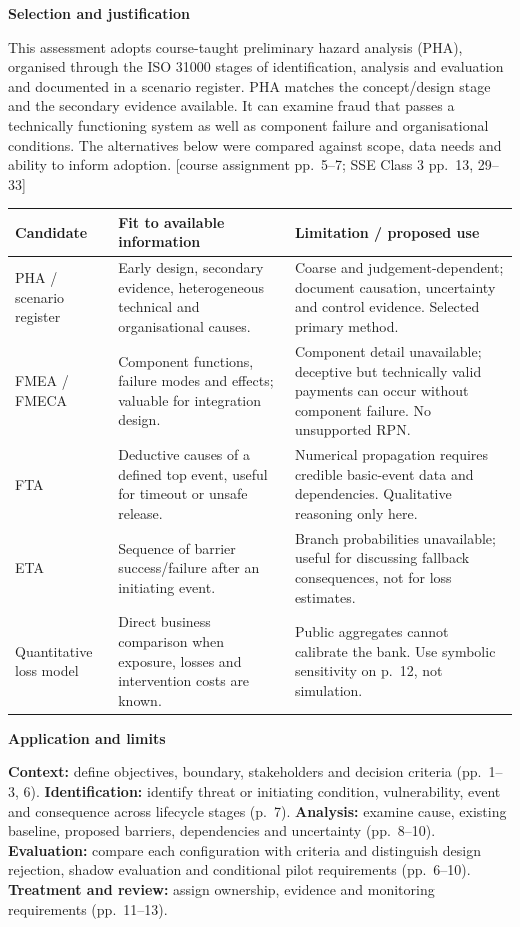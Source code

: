 \documentclass[11pt,a4paper]{article}
\newcommand{\heading}[2]{\vspace*{1mm}{\small\color{ink}\textbf{#1}}\par\vspace{2mm}{\LARGE\color{ink}\textbf{#2}}\par\vspace{3mm}}
\newcommand{\sub}[1]{\par\vspace{2mm}\textbf{\color{ink}#1}\par}
\newcommand{\src}[1]{{\small[#1]}}
\newcommand{\newpageof}[2]{\clearpage\normalsize\fontsize{10.5}{12.5}\selectfont\heading{#1}{#2}}
\begin{document}
\newpageof{4 | Assessment method}{Why PHA is the selected method}
\sub{Selection and justification}
This assessment adopts course-taught preliminary hazard analysis (PHA), organised through the ISO 31000 stages of identification, analysis and evaluation and documented in a scenario register. PHA matches the concept/design stage and the secondary evidence available. It can examine fraud that passes a technically functioning system as well as component failure and organisational conditions. The alternatives below were compared against scope, data needs and ability to inform adoption. \src{course assignment pp.~5--7; SSE Class 3 pp.~13, 29--33}
\par{\small\begin{tabularx}{\textwidth}{@{}P{27mm}YY@{}}\toprule
Candidate & Fit to available information & Limitation / proposed use\\\midrule
PHA / scenario register & Early design, secondary evidence, heterogeneous technical and organisational causes. & Coarse and judgement-dependent; document causation, uncertainty and control evidence. Selected primary method.\\
FMEA / FMECA & Component functions, failure modes and effects; valuable for integration design. & Component detail unavailable; deceptive but technically valid payments can occur without component failure. No unsupported RPN.\\
FTA & Deductive causes of a defined top event, useful for timeout or unsafe release. & Numerical propagation requires credible basic-event data and dependencies. Qualitative reasoning only here.\\
ETA & Sequence of barrier success/failure after an initiating event. & Branch probabilities unavailable; useful for discussing fallback consequences, not for loss estimates.\\
Quantitative loss model & Direct business comparison when exposure, losses and intervention costs are known. & Public aggregates cannot calibrate the bank. Use symbolic sensitivity on p.~12, not simulation.\\\bottomrule
\end{tabularx}\par}
\sub{Application and limits}
\textbf{Context:} define objectives, boundary, stakeholders and decision criteria (pp.~1--3, 6). \textbf{Identification:} identify threat or initiating condition, vulnerability, event and consequence across lifecycle stages (p.~7). \textbf{Analysis:} examine cause, existing baseline, proposed barriers, dependencies and uncertainty (pp.~8--10). \textbf{Evaluation:} compare each configuration with criteria and distinguish design rejection, shadow evaluation and conditional pilot requirements (pp.~6--10). \textbf{Treatment and review:} assign ownership, evidence and monitoring requirements (pp.~11--13).
\end{document}
